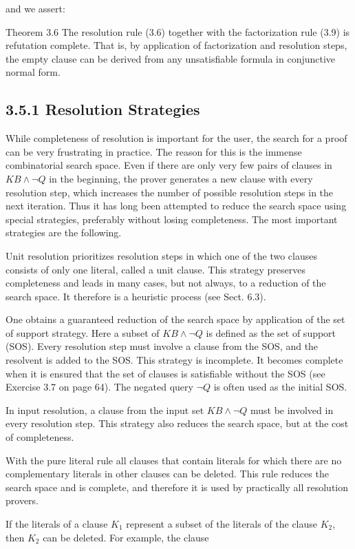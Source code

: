\documentclass[10pt]{article}
\begin{document}
and we assert:

Theorem 3.6 The resolution rule (3.6) together with the factorization rule (3.9) is refutation complete. That is, by application of factorization and resolution steps, the empty clause can be derived from any unsatisfiable formula in conjunctive normal form.

\subsection*{3.5.1 Resolution Strategies}
While completeness of resolution is important for the user, the search for a proof can be very frustrating in practice. The reason for this is the immense combinatorial search space. Even if there are only very few pairs of clauses in $K B \wedge \neg Q$ in the beginning, the prover generates a new clause with every resolution step, which increases the number of possible resolution steps in the next iteration. Thus it has long been attempted to reduce the search space using special strategies, preferably without losing completeness. The most important strategies are the following.

Unit resolution prioritizes resolution steps in which one of the two clauses consists of only one literal, called a unit clause. This strategy preserves completeness and leads in many cases, but not always, to a reduction of the search space. It therefore is a heuristic process (see Sect. 6.3).

One obtains a guaranteed reduction of the search space by application of the set of support strategy. Here a subset of $K B \wedge \neg Q$ is defined as the set of support (SOS). Every resolution step must involve a clause from the SOS, and the resolvent is added to the SOS. This strategy is incomplete. It becomes complete when it is ensured that the set of clauses is satisfiable without the SOS (see Exercise 3.7 on page 64). The negated query $\neg Q$ is often used as the initial SOS.

In input resolution, a clause from the input set $K B \wedge \neg Q$ must be involved in every resolution step. This strategy also reduces the search space, but at the cost of completeness.

With the pure literal rule all clauses that contain literals for which there are no complementary literals in other clauses can be deleted. This rule reduces the search space and is complete, and therefore it is used by practically all resolution provers.

If the literals of a clause $K_{1}$ represent a subset of the literals of the clause $K_{2}$, then $K_{2}$ can be deleted. For example, the clause
\end{document}
